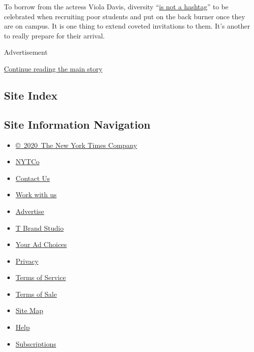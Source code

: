 To borrow from the actress Viola Davis, diversity
``\href{http://www.etonline.com/media/video/exclusive_viola_davis_says_hollywood_diversity_issue_is_not_a_hashtag-181257/}{is
not a hashtag}'' to be celebrated when recruiting poor students and put
on the back burner once they are on campus. It is one thing to extend
coveted invitations to them. It's another to really prepare for their
arrival.

Advertisement

\protect\hyperlink{after-bottom}{Continue reading the main story}

\hypertarget{site-index}{%
\subsection{Site Index}\label{site-index}}

\hypertarget{site-information-navigation}{%
\subsection{Site Information
Navigation}\label{site-information-navigation}}

\begin{itemize}
\tightlist
\item
  \href{https://help.nytimes.com/hc/en-us/articles/115014792127-Copyright-notice}{©~2020~The
  New York Times Company}
\end{itemize}

\begin{itemize}
\tightlist
\item
  \href{https://www.nytco.com/}{NYTCo}
\item
  \href{https://help.nytimes.com/hc/en-us/articles/115015385887-Contact-Us}{Contact
  Us}
\item
  \href{https://www.nytco.com/careers/}{Work with us}
\item
  \href{https://nytmediakit.com/}{Advertise}
\item
  \href{http://www.tbrandstudio.com/}{T Brand Studio}
\item
  \href{https://www.nytimes.com/privacy/cookie-policy\#how-do-i-manage-trackers}{Your
  Ad Choices}
\item
  \href{https://www.nytimes.com/privacy}{Privacy}
\item
  \href{https://help.nytimes.com/hc/en-us/articles/115014893428-Terms-of-service}{Terms
  of Service}
\item
  \href{https://help.nytimes.com/hc/en-us/articles/115014893968-Terms-of-sale}{Terms
  of Sale}
\item
  \href{https://spiderbites.nytimes.com}{Site Map}
\item
  \href{https://help.nytimes.com/hc/en-us}{Help}
\item
  \href{https://www.nytimes.com/subscription?campaignId=37WXW}{Subscriptions}
\end{itemize}
